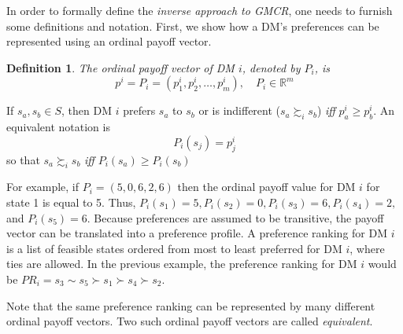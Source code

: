 \documentclass[letterpaper,12pt,titlepage,oneside,final]{book}
\newtheorem{definition}[lemma]{Definition}
\begin{document}
In order to formally define the \textit{inverse approach to GMCR}, one needs to furnish some definitions and notation. First, we show how a DM's preferences can be represented using an ordinal payoff vector. 

\begin{definition}
\label{def:ord_pref}
\rm
The ordinal payoff vector of DM $i$, denoted by $P_i$, is
$$p^i=P_i=(p_1^i,p_2^i, \dots ,p_m^i ) , \quad P_i \in \mathbb{R}^m  $$

\end{definition}

\noindent If $s_a,s_b \in S$, then DM $i$ prefers $s_a$ to $s_b$ or is indifferent ($s_a \succsim_i s_b$) \emph{iff} $p_a^i \geq p_b^i$. An equivalent notation is $$P_i(s_j)=p_j^i$$ so that $s_a\succsim_i s_b$ \emph{iff} $P_i(s_a)\geq P_i(s_b)$

For example, if $P_i=(5,0,6,2,6)$ then the ordinal payoff value for DM $i$ for state 1 is equal to 5. Thus, $P_i(s_1)=5,P_i(s_2)=0,P_i(s_3)=6,P_i(s_4)=2,$ and $P_i(s_5)=6$. Because preferences are assumed to be transitive, the payoff vector can be translated into a preference profile. A preference ranking for DM $i$ is a list of feasible states ordered from most to least preferred for DM $i$, where ties are allowed. %
In the previous example, the preference ranking for DM $i$ would be $PR_i=s_3 \sim s_5 \succ s_1 \succ s_4 \succ s_2$.

Note that the same preference ranking can be represented by many different ordinal payoff vectors. Two such ordinal payoff vectors are called \emph{equivalent}.

\end{document}
